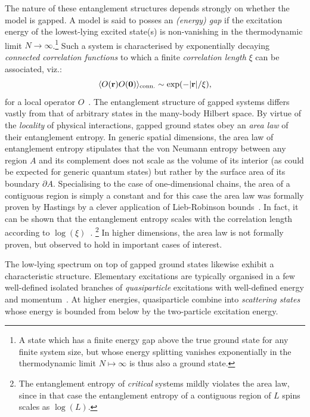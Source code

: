 \bigskip\noindent The nature of these entanglement structures depends strongly on whether the model is gapped. A model is said to posses an \emph{(energy) gap} if the excitation energy of the lowest-lying excited state(s) is non-vanishing in the thermodynamic limit $N\rightarrow\infty$.\footnote{A state which has a finite energy gap above the true ground state for any finite system size, but whose energy splitting vanishes exponentially in the thermodynamic limit $N\mapsto\infty$ is thus also a ground state.} Such a system is characterised by exponentially decaying \emph{connected correlation functions} to which a finite \emph{correlation length} $\xi$ can be associated, viz.:
\begin{equation}
	\langle O({\bf r}) O({\bf 0})\rangle_{\rm conn.} \sim \exp(-|{\bf r}|/\xi),
\end{equation}
for a local operator $O$~\cite{Hastings2004,Hastings2005}. The entanglement structure of gapped systems differs vastly from that of arbitrary states in the many-body Hilbert space. By virtue of the \emph{locality} of physical interactions, gapped ground states obey an \emph{area law} of their entanglement entropy. In generic spatial dimensions, the area law of entanglement entropy stipulates that the von Neumann entropy between any region $A$ and its complement does not scale as the volume of its interior (as could be expected for generic quantum states)  but rather by the surface area of its boundary $\partial A$. Specialising to the case of one-dimensional chains, the area of a contiguous region is simply a constant and for this case the area law was formally proven by Hastings by a clever application of Lieb-Robinson bounds~\cite{Hastings2007,Lieb1972}. In fact, it can be shown that the entanglement entropy scales with the correlation length according to $\log(\xi)$~\cite{Calabrese2004}. \footnote{The entanglement entropy of \emph{critical} systems mildly violates the area law, since in that case the entanglement entropy of a contiguous region of $L$ spins scales as $\log(L)$.} In higher dimensions, the area law is not formally proven, but observed to hold in important cases of interest.

The low-lying spectrum on top of gapped ground states likewise exhibit a characteristic structure.
Elementary excitations are typically organised in a few well-defined isolated branches of \emph{quasiparticle} excitations with well-defined energy and momentum~\cite{Bijl1941,Feynman1953,Feynman1954,Haegeman2011b,Vanderstraeten2013}. At higher energies, quasiparticle combine into \emph{scattering states} whose energy is bounded from below by the two-particle excitation energy.
